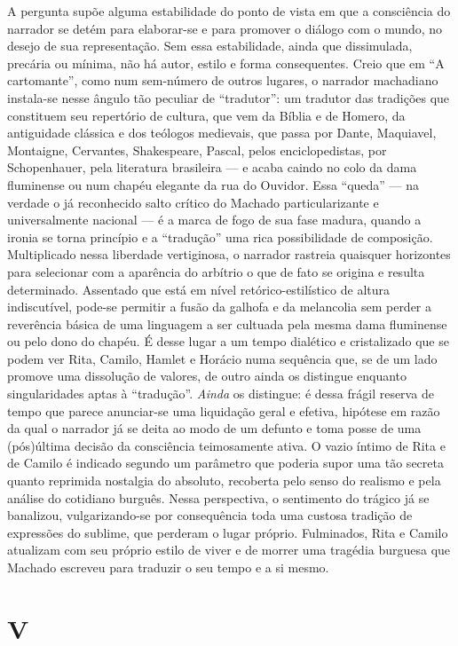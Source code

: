 A pergunta supõe alguma estabilidade do ponto de vista em que a
consciência do narrador se detém para elaborar-se e para promover o
diálogo com o mundo, no desejo de sua representação. Sem essa
estabilidade, ainda que dissimulada, precária ou mínima, não há autor,
estilo e forma consequentes. Creio que em ``A cartomante'', como num
sem-número de outros lugares, o narrador machadiano instala-se nesse
ângulo tão peculiar de ``tradutor'': um tradutor das tradições que
constituem seu repertório de cultura, que vem da Bíblia e de Homero, da
antiguidade clássica e dos teólogos medievais, que passa por Dante,
Maquiavel, Montaigne, Cervantes, Shakespeare, Pascal, pelos
enciclopedistas, por Schopenhauer, pela literatura brasileira --- e acaba
caindo no colo da dama fluminense ou num chapéu elegante da rua do
Ouvidor. Essa ``queda'' --- na verdade o já reconhecido salto crítico do
Machado particularizante e universalmente nacional --- é a marca de fogo
de sua fase madura, quando a ironia se torna princípio e a ``tradução''
uma rica possibilidade de composição. Multiplicado nessa liberdade
vertiginosa, o narrador rastreia quaisquer horizontes para selecionar
com a aparência do arbítrio o que de fato se origina e resulta
determinado. Assentado que está em nível retórico-estilístico de altura
indiscutível, pode-se permitir a fusão da galhofa e da melancolia sem
perder a reverência básica de uma linguagem a ser cultuada pela mesma
dama fluminense ou pelo dono do chapéu. É desse lugar a um tempo
dialético e cristalizado que se podem ver Rita, Camilo, Hamlet e Horácio
numa sequência que, se de um lado promove uma dissolução de valores, de
outro ainda os distingue enquanto singularidades aptas à ``tradução''.
\emph{Ainda} os distingue: é dessa frágil reserva de tempo que parece
anunciar-se uma liquidação geral e efetiva, hipótese em razão da qual o
narrador já se deita ao modo de um defunto e toma posse de uma
(pós)última decisão da consciência teimosamente ativa. O vazio íntimo de
Rita e de Camilo é indicado segundo um parâmetro que poderia supor uma
tão secreta quanto reprimida nostalgia do absoluto, recoberta pelo senso
do realismo e pela análise do cotidiano burguês. Nessa perspectiva, o
sentimento do trágico já se banalizou, vulgarizando-se por consequência
toda uma custosa tradição de expressões do sublime, que perderam o lugar
próprio. Fulminados, Rita e Camilo atualizam com seu próprio estilo de
viver e de morrer uma tragédia burguesa que Machado escreveu para
traduzir o seu tempo e a si mesmo.

\section*{V}

